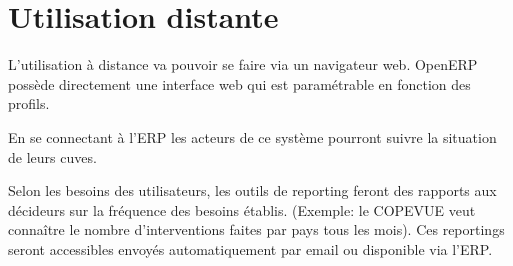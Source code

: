 \section{Utilisation distante}

L'utilisation à distance va pouvoir se faire via un navigateur web. OpenERP
possède directement une interface web qui est paramétrable en fonction des
profils.

En se connectant à l'ERP les acteurs de ce système pourront suivre la
situation de leurs cuves.

Selon les besoins des utilisateurs, les outils de reporting feront des
rapports aux décideurs sur la fréquence des besoins établis. (Exemple: le
COPEVUE veut connaître le nombre d'interventions faites par pays tous les
mois). Ces reportings seront accessibles envoyés automatiquement par email
ou disponible via l'ERP. 
